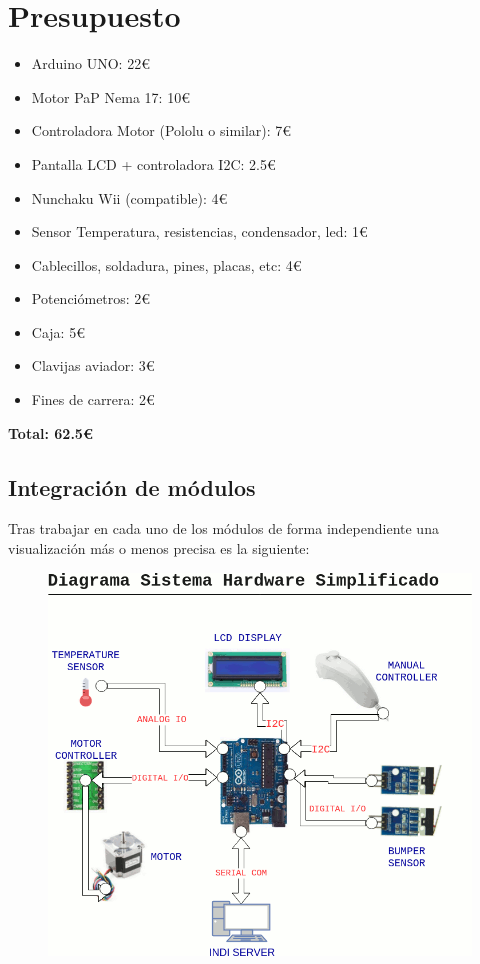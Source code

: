 \section{Presupuesto}

\begin{itemize}
	\item Arduino UNO: 22\euro
	\item Motor PaP Nema 17: 10\euro
	\item Controladora Motor (Pololu o similar): 7\euro
	\item Pantalla LCD + controladora I2C: 2.5\euro
	\item Nunchaku Wii (compatible): 4\euro
	\item Sensor Temperatura, resistencias, condensador, led: 1\euro
	\item Cablecillos, soldadura, pines, placas, etc: 4\euro
	\item Potenciómetros: 2\euro
	\item Caja: 5\euro
	\item Clavijas aviador: 3\euro
	\item Fines de carrera: 2\euro
	
	
\end{itemize}
\textbf{Total: 62.5\euro}

\subsection{Integración de módulos}
\bigskip
Tras trabajar en cada uno de los módulos de forma independiente una visualización más o menos precisa es la siguiente:

\begin{figure}[h]
	\centering
	\includegraphics[width=0.9\linewidth]{../images/diagramaHardware}
	\caption{}
	\label{fig:diagramaHardware}
\end{figure}

